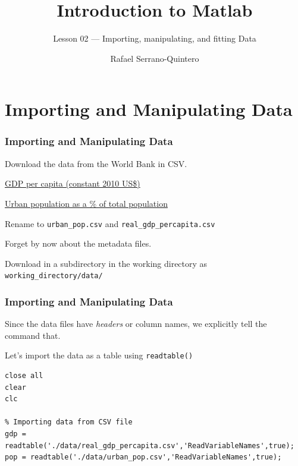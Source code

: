 \documentclass[11pt,xcolor={svgnames},aspectratio=169,usepdftitle=false]{beamer}
\title{Introduction to Matlab}
\subtitle{Lesson 02 --- Importing, manipulating, and fitting Data}
\author{Rafael Serrano-Quintero}
\institute{Department of Economics \\ University of Barcelona}
\date{}
\let\toneitemize\itemize
\let\ttwoitemize\enditemize
\renewenvironment{itemize}{\toneitemize\addtolength{\itemsep}{0.7\baselineskip}}{\ttwoitemize}
\begin{document}
\VerbatimFootnotes

\maketitle

\section{Importing and Manipulating Data}

\begin{frame}[fragile]
    \frametitle{Importing and Manipulating Data}
\begin{itemize}
    \item Download the data from the World Bank in CSV.
    \begin{itemize}
        \item \href{https://data.worldbank.org/indicator/NY.GDP.PCAP.KD}{GDP per capita (constant 2010 US\$)}
        \item \href{https://data.worldbank.org/indicator/SP.URB.TOTL.IN.ZS}{Urban population as a \% of total population}
    \end{itemize}
    \item Rename to \verb;urban_pop.csv; and \verb;real_gdp_percapita.csv;
    \item Forget by now about the metadata files.
    \item Download in a subdirectory in the working directory as \verb;working_directory/data/;
\end{itemize}
\end{frame}

\begin{frame}[fragile]
  \frametitle{Importing and Manipulating Data}
\begin{itemize}
  \item Since the data files have \textit{headers} or column names, we explicitly tell the command that.
  \item Let's import the data as a table using \verb;readtable();
\end{itemize}
\begin{lstlisting}
close all
clear
clc

% Importing data from CSV file
gdp = readtable('./data/real_gdp_percapita.csv','ReadVariableNames',true);
pop = readtable('./data/urban_pop.csv','ReadVariableNames',true);  
\end{lstlisting}
\end{frame}
\end{document}
